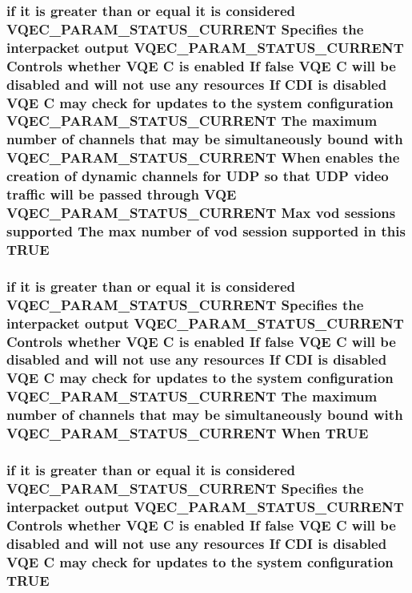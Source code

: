 \subsubsection{\setlength{\rightskip}{0pt plus 5cm}if it is greater than or equal it is considered VQEC\_\-PARAM\_\-STATUS\_\-CURRENT Specifies the interpacket output VQEC\_\-PARAM\_\-STATUS\_\-CURRENT Controls whether VQE \bf{C} is enabled If false VQE \bf{C} will be disabled and will not use any resources If CDI is disabled VQE \bf{C} may check for updates \bf{to} the system configuration VQEC\_\-PARAM\_\-STATUS\_\-CURRENT The maximum number of \bf{channels} that may be simultaneously bound with VQEC\_\-PARAM\_\-STATUS\_\-CURRENT When enables the creation of dynamic \bf{channels} for UDP so that UDP video traffic will be passed through VQE VQEC\_\-PARAM\_\-STATUS\_\-CURRENT Max vod sessions supported The max number of vod session supported in \bf{this} \bf{TRUE}}\label{vqec__cfg__settings_8h_6393538b4837beb0d0e341648ce810bf}


\subsubsection{\setlength{\rightskip}{0pt plus 5cm}if it is greater than or equal it is considered VQEC\_\-PARAM\_\-STATUS\_\-CURRENT Specifies the interpacket output VQEC\_\-PARAM\_\-STATUS\_\-CURRENT Controls whether VQE \bf{C} is enabled If false VQE \bf{C} will be disabled and will not use any resources If CDI is disabled VQE \bf{C} may check for updates \bf{to} the system configuration VQEC\_\-PARAM\_\-STATUS\_\-CURRENT The maximum number of \bf{channels} that may be simultaneously bound with VQEC\_\-PARAM\_\-STATUS\_\-CURRENT When \bf{TRUE}}\label{vqec__cfg__settings_8h_26960adc9190c76d82db37d5c73810d9}


\subsubsection{\setlength{\rightskip}{0pt plus 5cm}if it is greater than or equal it is considered VQEC\_\-PARAM\_\-STATUS\_\-CURRENT Specifies the interpacket output VQEC\_\-PARAM\_\-STATUS\_\-CURRENT Controls whether VQE \bf{C} is enabled If false VQE \bf{C} will be disabled and will not use any resources If CDI is disabled VQE \bf{C} may check for updates \bf{to} the system configuration \bf{TRUE}}\label{vqec__cfg__settings_8h_97dadabd18c24611b92b65b3e6d70dd6}


